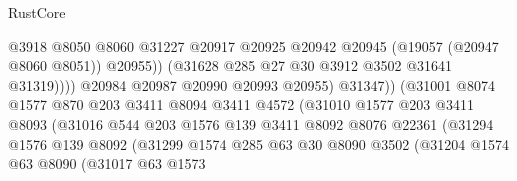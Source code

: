 \begin{lexlean}{RustCore}
\begin{coremodule}
                                              @3918
                                              @8050
                                              @8060
                                              @31227
                                              @20917
                                              @20925
                                              @20942
                                              @20945
                                              (@19057 (@20947 @8060 @8051))
                                              @20955))
                                          (@31628 @285 @27 @30 @3912 @3502 @31641 @31319))))
                                    @20984
                                    @20987
                                    @20990
                                    @20993
                                    @20955)
                                  @31347))
                              (@31001
                                @8074
                                @1577
                                @870
                                @203
                                @3411
                                @8094
                                @3411
                                @4572
                                (@31010
                                  @1577
                                  @203
                                  @3411
                                  @8093
                                  (@31016
                                    @544
                                    @203
                                    @1576
                                    @139
                                    @3411
                                    @8092
                                    @8076
                                    @22361
                                    (@31294
                                      @1576
                                      @139
                                      @8092
                                      (@31299
                                        @1574
                                        @285
                                        @63
                                        @30
                                        @8090
                                        @3502
                                        (@31204
                                          @1574
                                          @63
                                          @8090
                                          (@31017
                                            @63
                                            @1573

\end{coremodule}
\end{lexlean}
